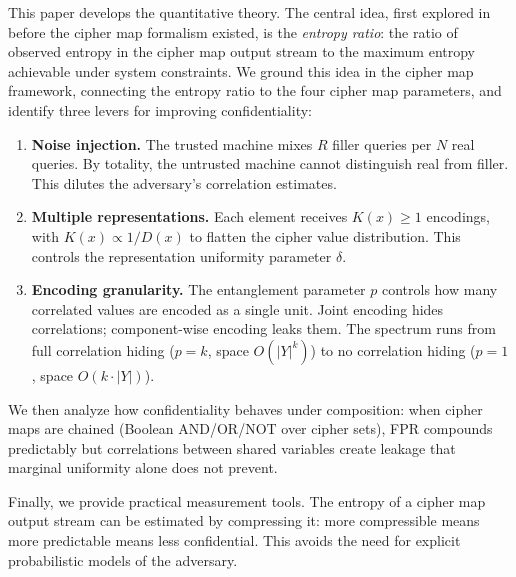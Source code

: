 \documentclass[11pt]{article}
\theoremstyle{definition}
\theoremstyle{plain}
\theoremstyle{remark}
\begin{document}
This paper develops the quantitative theory.  The central idea, first
explored in~\cite{towell2017maxconf} before the cipher map formalism
existed, is the \emph{entropy ratio}: the ratio of observed entropy in
the cipher map output stream to the maximum entropy achievable under
system constraints.  We ground this idea in the cipher map framework,
connecting the entropy ratio to the four cipher map parameters, and
identify three levers for improving confidentiality:

\begin{enumerate}
\item \textbf{Noise injection.}  The trusted machine mixes $R$ filler
  queries per $N$ real queries.  By totality, the untrusted machine
  cannot distinguish real from filler.  This dilutes the adversary's
  correlation estimates.

\item \textbf{Multiple representations.}  Each element receives
  $K(x) \geq 1$ encodings, with $K(x) \propto 1/D(x)$ to flatten the
  cipher value distribution.  This controls the representation uniformity
  parameter $\delta$.

\item \textbf{Encoding granularity.}  The entanglement parameter $p$
  controls how many correlated values are encoded as a single unit.
  Joint encoding hides correlations; component-wise encoding leaks them.
  The spectrum runs from full correlation hiding ($p = k$, space
  $O(|Y|^k)$) to no correlation hiding ($p = 1$, space $O(k \cdot |Y|)$).
\end{enumerate}

We then analyze how confidentiality behaves under composition: when
cipher maps are chained (Boolean AND/OR/NOT over cipher sets), FPR
compounds predictably but correlations between shared variables create
leakage that marginal uniformity alone does not prevent.

Finally, we provide practical measurement tools.  The entropy of a cipher
map output stream can be estimated by compressing it: more compressible
means more predictable means less confidential.  This avoids the need for
explicit probabilistic models of the adversary.
\end{document}
